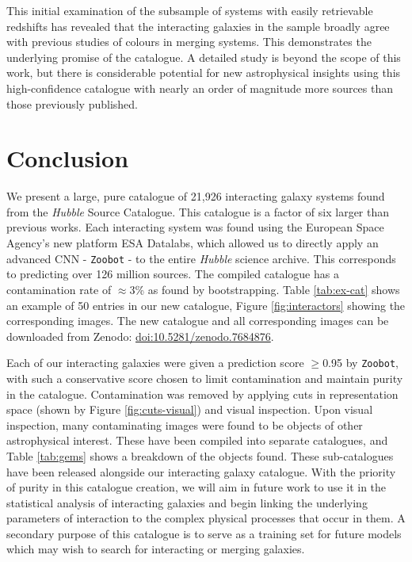 {This initial examination of the subsample of systems with easily retrievable redshifts has revealed that the interacting galaxies in the sample broadly agree with previous studies of colours in merging systems. This demonstrates the underlying promise of the catalogue. A detailed study is beyond the scope of this work, but there is considerable potential for new astrophysical insights using this high-confidence catalogue with nearly an order of magnitude more sources than those previously published.

\vspace{-3mm}

\section{Conclusion}\label{conclusion}
\noindent We present a large, pure catalogue of 21,926 interacting galaxy systems found from the \emph{Hubble} Source Catalogue. This catalogue is a factor of six larger than previous works. Each interacting system was found using the European Space Agency's new platform ESA Datalabs, which allowed us to directly apply an advanced CNN - \texttt{Zoobot} - to the entire \emph{Hubble} science archive. This corresponds to predicting over 126 million sources. The compiled catalogue has a contamination rate of $\approx$3\% as found by bootstrapping. Table \ref{tab:ex-cat} shows an example of 50 entries in our new catalogue, Figure \ref{fig:interactors} showing the corresponding images. The new catalogue and all corresponding images can be downloaded from Zenodo: \href{https://doi.org/10.5281/zenodo.7684876}{doi:10.5281/zenodo.7684876}.

Each of our interacting galaxies were given a prediction score $\geq$0.95 by \texttt{Zoobot}, with such a conservative score chosen to limit contamination and maintain purity in the catalogue. Contamination was removed by applying cuts in representation space (shown by Figure \ref{fig:cuts-visual}) and visual inspection. Upon visual inspection, many contaminating images were found to be objects of other astrophysical interest. These have been compiled into separate catalogues, and Table \ref{tab:gems} shows a breakdown of the objects found. These sub-catalogues have been released alongside our interacting galaxy catalogue. With the priority of purity in this catalogue creation, we will aim in future work to use it in the statistical analysis of interacting galaxies and begin linking the underlying parameters of interaction to the complex physical processes that occur in them. A secondary purpose of this catalogue is to serve as a training set for future models which may wish to search for interacting or merging galaxies.

}
